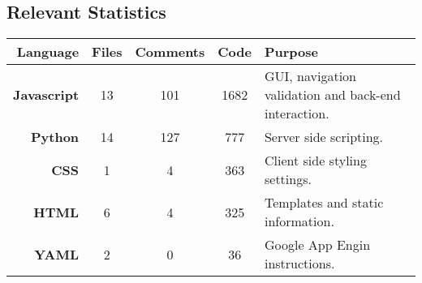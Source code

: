 \subsection{Relevant Statistics}
\begin{center}
\begin{tabular}{|r|c|c|c|l|}
\hline
\bf{Language} & \bf{Files} & \bf{Comments} & \bf{Code} & \bf{Purpose} \\
\hline 
\bf{Javascript} & 13 & 101 & 1682 & GUI, navigation validation and back-end interaction. \\
\bf{Python} & 14 & 127 & 777 & Server side scripting. \\
\hline
\bf{CSS} & 1 & 4 & 363 & Client side styling settings. \\
\hline
\bf{HTML} & 6 & 4 & 325 & Templates and static information. \\
\hline
\bf{YAML} & 2 & 0 & 36 & Google App Engin instructions.\\
\hline	
\end{tabular}
\end{center}